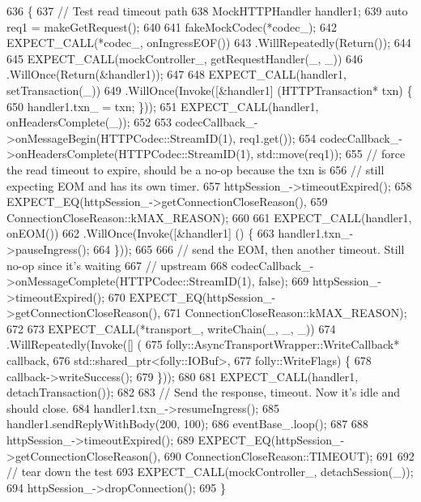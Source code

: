 \begin{DoxyCode}
636                                              \{
637   \textcolor{comment}{// Test read timeout path}
638   MockHTTPHandler handler1;
639   \textcolor{keyword}{auto} req1 = makeGetRequest();
640 
641   fakeMockCodec(*codec\_);
642   EXPECT\_CALL(*codec\_, onIngressEOF())
643     .WillRepeatedly(Return());
644 
645   EXPECT\_CALL(mockController\_, getRequestHandler(\_, \_))
646     .WillOnce(Return(&handler1));
647 
648   EXPECT\_CALL(handler1, setTransaction(\_))
649     .WillOnce(Invoke([&handler1] (HTTPTransaction* txn) \{
650           handler1.txn_ = txn; \}));
651   EXPECT\_CALL(handler1, onHeadersComplete(\_));
652 
653   codecCallback\_->onMessageBegin(HTTPCodec::StreamID(1), req1.get());
654   codecCallback\_->onHeadersComplete(HTTPCodec::StreamID(1), std::move(req1));
655   \textcolor{comment}{// force the read timeout to expire, should be a no-op because the txn is}
656   \textcolor{comment}{// still expecting EOM and has its own timer.}
657   httpSession\_->timeoutExpired();
658   EXPECT\_EQ(httpSession\_->getConnectionCloseReason(),
659             ConnectionCloseReason::kMAX\_REASON);
660 
661   EXPECT\_CALL(handler1, onEOM())
662     .WillOnce(Invoke([&handler1] () \{
663           handler1.txn_->pauseIngress();
664         \}));
665 
666   \textcolor{comment}{// send the EOM, then another timeout.  Still no-op since it's waiting}
667   \textcolor{comment}{// upstream}
668   codecCallback\_->onMessageComplete(HTTPCodec::StreamID(1), \textcolor{keyword}{false});
669   httpSession\_->timeoutExpired();
670   EXPECT\_EQ(httpSession\_->getConnectionCloseReason(),
671             ConnectionCloseReason::kMAX\_REASON);
672 
673   EXPECT\_CALL(*transport\_, writeChain(\_, \_, \_))
674     .WillRepeatedly(Invoke([] (
675             folly::AsyncTransportWrapper::WriteCallback* callback,
676             std::shared\_ptr<folly::IOBuf>,
677             folly::WriteFlags) \{
678           callback->writeSuccess();
679           \}));
680 
681   EXPECT\_CALL(handler1, detachTransaction());
682 
683   \textcolor{comment}{// Send the response, timeout.  Now it's idle and should close.}
684   handler1.txn_->resumeIngress();
685   handler1.sendReplyWithBody(200, 100);
686   eventBase\_.loop();
687 
688   httpSession\_->timeoutExpired();
689   EXPECT\_EQ(httpSession\_->getConnectionCloseReason(),
690             ConnectionCloseReason::TIMEOUT);
691 
692   \textcolor{comment}{// tear down the test}
693   EXPECT\_CALL(mockController\_, detachSession(\_));
694   httpSession\_->dropConnection();
695 \}
\end{DoxyCode}
